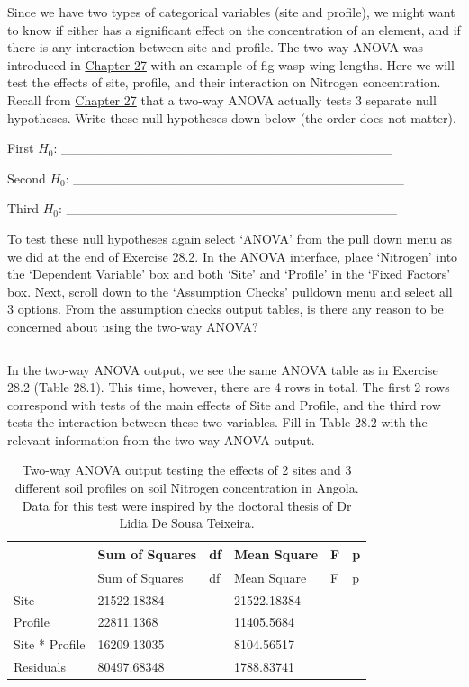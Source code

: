 \documentclass[
]{scrbook}
\begin{document}
Since we have two types of categorical variables (site and profile), we might want to know if either has a significant effect on the concentration of an element, and if there is any interaction between site and profile.
The two-way ANOVA was introduced in \protect\hyperlink{Chapter_27}{Chapter 27} with an example of fig wasp wing lengths.
Here we will test the effects of site, profile, and their interaction on Nitrogen concentration.
Recall from \protect\hyperlink{Chapter_27}{Chapter 27} that a two-way ANOVA actually tests 3 separate null hypotheses.
Write these null hypotheses down below (the order does not matter).

First \(H_{0}\): \_\_\_\_\_\_\_\_\_\_\_\_\_\_\_\_\_\_\_\_\_\_\_\_\_\_\_\_\_\_\_\_\_\_\_

Second \(H_{0}\): \_\_\_\_\_\_\_\_\_\_\_\_\_\_\_\_\_\_\_\_\_\_\_\_\_\_\_\_\_\_\_\_\_\_\_

Third \(H_{0}\): \_\_\_\_\_\_\_\_\_\_\_\_\_\_\_\_\_\_\_\_\_\_\_\_\_\_\_\_\_\_\_\_\_\_\_

To test these null hypotheses again select `ANOVA' from the pull down menu as we did at the end of Exercise 28.2.
In the ANOVA interface, place `Nitrogen' into the `Dependent Variable' box and both `Site' and `Profile' in the `Fixed Factors' box.
Next, scroll down to the `Assumption Checks' pulldown menu and select all 3 options.
From the assumption checks output tables, is there any reason to be concerned about using the two-way ANOVA?

\begin{verbatim}
\end{verbatim}

In the two-way ANOVA output, we see the same ANOVA table as in Exercise 28.2 (Table 28.1).
This time, however, there are 4 rows in total.
The first 2 rows correspond with tests of the main effects of Site and Profile, and the third row tests the interaction between these two variables.
Fill in Table 28.2 with the relevant information from the two-way ANOVA output.

\begin{longtable}[]{@{}llllll@{}}
\caption{\label{tab:unnamed-chunk-134}Two-way ANOVA output testing the effects of 2 sites and 3 different soil profiles on soil Nitrogen concentration in Angola. Data for this test were inspired by the doctoral thesis of Dr Lidia De Sousa Teixeira.}\tabularnewline
\toprule
& Sum of Squares & df & Mean Square & F & p \\
\midrule
\endfirsthead
\toprule
& Sum of Squares & df & Mean Square & F & p \\
\midrule
\endhead
Site & 21522.18384 & & 21522.18384 & & \\
Profile & 22811.1368 & & 11405.5684 & & \\
Site * Profile & 16209.13035 & & 8104.56517 & & \\
Residuals & 80497.68348 & & 1788.83741 & & \\
\bottomrule
\end{longtable}
\end{document}

